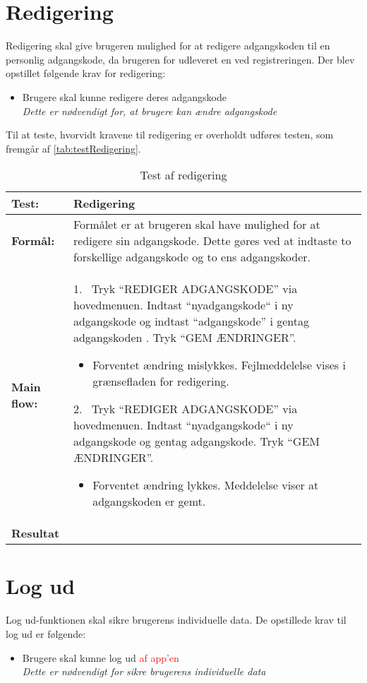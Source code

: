 \section{Redigering}
Redigering skal give brugeren mulighed for at redigere adgangskoden til en personlig adgangskode, da brugeren for udleveret en ved registreringen. Der blev opstillet følgende krav for redigering:

\begin{itemize}
\item Brugere skal kunne redigere deres adgangskode
\\
\textit{Dette er nødvendigt for, at brugere kan ændre adgangskode}
\end{itemize}

\noindent
Til at teste, hvorvidt kravene til redigering er overholdt udføres testen, som fremgår af \autoref{tab:testRedigering}.

\begin{table} [H]
	\centering
  \begin{tabular}{ | l | p{14cm} |} \hline
    \textbf{Test:} & Redigering \\ \hline
  \textbf{Formål:} & Formålet er at brugeren skal have mulighed for at redigere sin adgangskode. Dette gøres ved at indtaste to forskellige adgangskode og to ens adgangskoder. 
 \\ \hline
 	\textbf{Main flow:} & 1.~ Tryk “REDIGER ADGANGSKODE” via hovedmenuen. Indtast “nyadgangskode“ i ny adgangskode og indtast “adgangskode” i gentag adgangskoden . Tryk “GEM ÆNDRINGER”.   
 	\begin{itemize} [label={\checkmark}]
 	\item Forventet ændring mislykkes. Fejlmeddelelse vises i grænsefladen for redigering.
 	\end{itemize}	
 	2.~ Tryk “REDIGER ADGANGSKODE” via hovedmenuen. Indtast “nyadgangskode“ i ny adgangskode og gentag adgangskode. Tryk “GEM ÆNDRINGER”. 
 	\begin{itemize}[label={\checkmark}]
 	\item Forventet ændring lykkes. Meddelelse viser at adgangskoden er gemt. 
	\end{itemize}
\\ \hline
\textbf{Resultat} &\\ \hline
   \end{tabular}
   \caption{Test af redigering}
    \label{tab:testRedigering}
\end{table}


\section{Log ud}
Log ud-funktionen skal sikre brugerens individuelle data. De opstillede krav til log ud er følgende:
\begin{itemize}
\item Brugere skal kunne log ud \textcolor{red}{af app’en}
\\
\textit{Dette er nødvendigt for sikre brugerens individuelle data}
\end{itemize}

